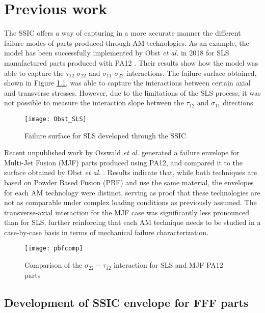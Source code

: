 \documentclass[main.tex]{subfiles}
\begin{document}
\chapter{Previous work} \label{ch:oocrit}


The SSIC offers a way of capturing in a more accurate manner the different failure modes of parts produced through AM technologies. As an example, the model has been successfully implemented by Obst \emph{et al.} in 2018 for SLS manufactured parts produced with PA12 \cite{Obst2018, Obst2017}. Their results show how the model was able to capture the $\tau_{12}$-$\sigma_{22}$ and $\sigma_{11}$-$\sigma_{22}$ interactions. The failure surface obtained, shown in Figure \ref{fig:OOCSLS}, was able to capture the interactions between certain axial and transverse stresses. However, due to the limitations of the SLS process, it was not possible to measure the interaction slope between the $\tau_{12}$ and $\sigma_{11}$ directions.

\begin{figure}[h]
	\center
	\texttt{[image: Obst\_SLS]}
	\caption{Failure surface for SLS developed through the SSIC \cite{Obst2018}} \label{fig:OOCSLS}
\end{figure}

Recent unpublished work by Osswald \emph{et al.} \cite{Osswald2020} generated a failure envelope for Multi-Jet Fusion (MJF) parts produced using PA12, and compared it to the surface obtained by Obst \emph{et al.} \cite{Obst2018}. Results indicate that, while both techniques are based on Powder Based Fusion (PBF) and use the same material, the envelopes for each AM technology were distinct, serving as proof that these technologies are not as comparable under complex loading conditions as previously assumed. The transverse-axial interaction for the MJF case was significantly less pronounced than for SLS, further reinforcing that each AM technique needs to be studied in a case-by-case basis in terms of mechanical failure characterization. 

\begin{figure}[!htbp]
	\center
	\texttt{[image: pbfcomp]}
	\caption{Comparison of the $\sigma_{22} - \tau_{12}$ interaction for SLS and MJF PA12 parts \cite{Osswald2020}} \label{fig:pbfcomp}
\end{figure}

\section{Development of SSIC envelope for FFF parts}\label{sec:SSICFFF}
\end{document}

